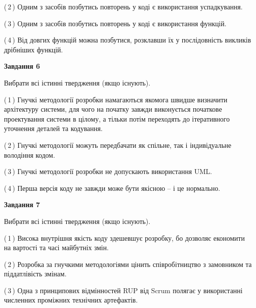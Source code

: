\documentclass[10pt, ukrainian]{article}
\begin{document}
{\begin {large}
(\,2\,) Одним з засобів позбутись повторень у коді є використання успадкування. %



(\,3\,) Одним з засобів позбутись повторень у коді є використання функцій. %



(\,4\,) Від довгих функцій можна позбутися, розклавши їх у послідовність викликів дрібніших функцій. %

\newpage

{\begin {center}\textbf{Завдання 6}\end {center}}\par
Вибрати всі істинні твердження (якщо існують).\par
\vspace{2mm}



(\,1\,) Гнучкі методології розробки намагаються якомога швидше визначити архітектуру системи, для чого на початку завжди виконується початкове проектування системи в цілому, а тільки потім переходять до ітеративного уточнення деталей та кодування. %



(\,2\,) Гнучкі методології можуть передбачати як спільне, так і індивідуальне володіння кодом. %



(\,3\,) Гнучкі методології розробки не допускають використання UML. %



(\,4\,) Перша версія коду не завжди може бути якісною -- і це нормально. %


{\begin {center}\textbf{Завдання 7}\end {center}}\par
Вибрати всі істинні твердження (якщо існують).\par
\vspace{2mm}



(\,1\,) Висока внутрішня якість коду здешевшує розробку, бо дозволяє економити на вартості та часі майбутніх змін. %



(\,2\,) Розробка за гнучкими методологіями цінить співробітництво з замовником та піддатлівість змінам. %



(\,3\,) Одна з принципових відмінностей RUP від Scrum полягає у використанні численних проміжних технічних артефактів. %




\end{large}}
\end{document}
